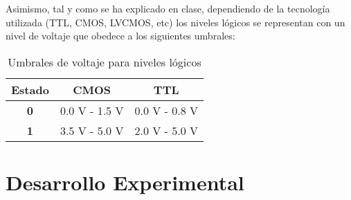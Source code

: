 Asimismo, tal y como se ha explicado en clase, dependiendo de la tecnología utilizada (TTL, CMOS, LVCMOS, etc) los niveles
lógicos se representan con un nivel de voltaje que obedece a los siguientes umbrales:

\begin{table}[H]
    \centering
    \begin{tabular}{|c|c|c|}
        \hline
        \textbf{Estado} & \textbf{CMOS} & \textbf{TTL}  \\ \hline
        \textbf{0}      & 0.0 V - 1.5 V & 0.0 V - 0.8 V \\ \hline
        \textbf{1}      & 3.5 V - 5.0 V & 2.0 V - 5.0 V \\ \hline
    \end{tabular}
    \caption{Umbrales de voltaje para niveles lógicos}
    \label{table:umbralesLogicos}
\end{table}





\section{Desarrollo Experimental}

